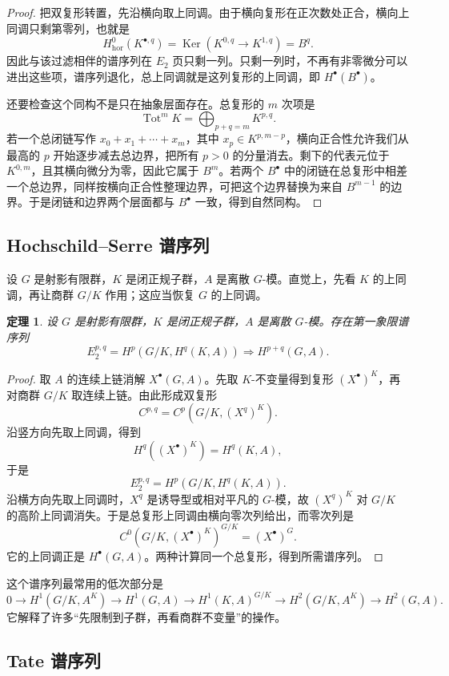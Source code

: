 \documentclass[11pt,a4paper,openany]{ctexbook}
\numberwithin{equation}{chapter}
\newcommand{\Ker}{\operatorname{Ker}}
\theoremstyle{plain}
\newtheorem{theorem}{定理}[chapter]
\theoremstyle{definition}
\theoremstyle{remark}
\begin{document}
\begin{proof}
把双复形转置，先沿横向取上同调。由于横向复形在正次数处正合，横向上同调只剩第零列，也就是
\[
H^0_{\mathrm{hor}}(K^{\bullet,q})=\Ker(K^{0,q}\to K^{1,q})=B^q.
\]
因此与该过滤相伴的谱序列在 $E_2$ 页只剩一列。只剩一列时，不再有非零微分可以进出这些项，谱序列退化，总上同调就是这列复形的上同调，即 $H^\bullet(B^\bullet)$。

还要检查这个同构不是只在抽象层面存在。总复形的 $m$ 次项是
\[
\operatorname{Tot}^mK=\bigoplus_{p+q=m}K^{p,q}.
\]
若一个总闭链写作 $x_0+x_1+\cdots+x_m$，其中 $x_p\in K^{p,m-p}$，横向正合性允许我们从最高的 $p$ 开始逐步减去总边界，把所有 $p>0$ 的分量消去。剩下的代表元位于 $K^{0,m}$，且其横向微分为零，因此它属于 $B^m$。若两个 $B^\bullet$ 中的闭链在总复形中相差一个总边界，同样按横向正合性整理边界，可把这个边界替换为来自 $B^{m-1}$ 的边界。于是闭链和边界两个层面都与 $B^\bullet$ 一致，得到自然同构。
\end{proof}

\subsection{Hochschild--Serre 谱序列}

设 $G$ 是射影有限群，$K$ 是闭正规子群，$A$ 是离散 $G$-模。直觉上，先看 $K$ 的上同调，再让商群 $G/K$ 作用；这应当恢复 $G$ 的上同调。

\begin{theorem}
设 $G$ 是射影有限群，$K$ 是闭正规子群，$A$ 是离散 $G$-模。存在第一象限谱序列
\[
E_2^{p,q}=H^p(G/K,H^q(K,A))\Rightarrow H^{p+q}(G,A).
\]
\end{theorem}

\begin{proof}
取 $A$ 的连续上链消解 $X^\bullet(G,A)$。先取 $K$-不变量得到复形 $(X^\bullet)^K$，再对商群 $G/K$ 取连续上链。由此形成双复形
\[
C^{p,q}=C^p(G/K,(X^q)^K).
\]
沿竖方向先取上同调，得到
\[
H^q((X^\bullet)^K)=H^q(K,A),
\]
于是
\[
E_2^{p,q}=H^p(G/K,H^q(K,A)).
\]
沿横方向先取上同调时，$X^q$ 是诱导型或相对平凡的 $G$-模，故 $(X^q)^K$ 对 $G/K$ 的高阶上同调消失。于是总复形上同调由横向零次列给出，而零次列是
\[
C^0(G/K,(X^\bullet)^K)^{G/K}=(X^\bullet)^G.
\]
它的上同调正是 $H^\bullet(G,A)$。两种计算同一个总复形，得到所需谱序列。
\end{proof}

这个谱序列最常用的低次部分是
\[
0\to H^1(G/K,A^K)\to H^1(G,A)\to H^1(K,A)^{G/K}
\to H^2(G/K,A^K)\to H^2(G,A).
\]
它解释了许多“先限制到子群，再看商群不变量”的操作。

\subsection{Tate 谱序列}
\end{document}
